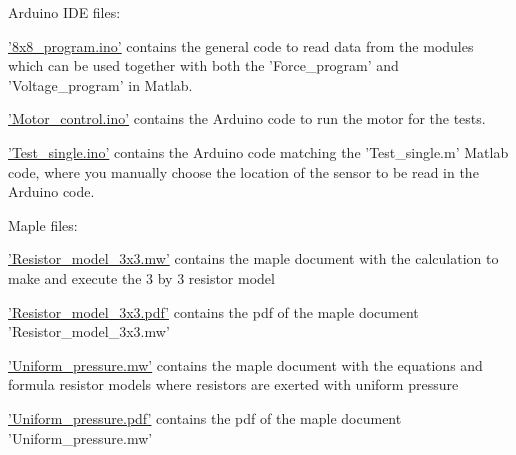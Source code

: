 Arduino IDE files:
    \begin{continuing}
        \item 
        \href{https://github.com/s214413/Force-Displacement-Visualization-through-3D-Printed-Sensor-Grid/blob/main/Arduino/8x8_program.ino}{'8x8\_program.ino'} contains the general code to read data from the modules which can be used together with both the 'Force\_program' and 'Voltage\_program' in Matlab.
        \item 
        \href{https://github.com/s214413/Force-Displacement-Visualization-through-3D-Printed-Sensor-Grid/blob/main/Arduino/Motor_control.ino}{'Motor\_control.ino'} contains the Arduino code to run the motor for the tests.
        \item 
        \href{https://github.com/s214413/Force-Displacement-Visualization-through-3D-Printed-Sensor-Grid/blob/main/Arduino/Test_single.ino}{'Test\_single.ino'} contains the Arduino code matching the 'Test\_single.m' Matlab code, where you manually choose the location of the sensor to be read in the Arduino code.
    \end{continuing}
    
Maple files:
    \begin{continuing}
        \item 
        \href{https://github.com/s214413/Force-Displacement-Visualization-through-3D-Printed-Sensor-Grid/blob/main/Maple/Resistor_model_3x3.mw}{'Resistor\_model\_3x3.mw'} contains the maple document with the calculation to make and execute the 3 by 3 resistor model
        \item 
        \href{https://github.com/s214413/Force-Displacement-Visualization-through-3D-Printed-Sensor-Grid/blob/main/Maple/Resistor_model_3x3.pdf}{'Resistor\_model\_3x3.pdf'} contains the pdf of the maple document 'Resistor\_model\_3x3.mw'
        \item 
        \href{https://github.com/s214413/Force-Displacement-Visualization-through-3D-Printed-Sensor-Grid/blob/main/Maple/Uniform_pressure.mw}{'Uniform\_pressure.mw'} contains the maple document with the equations and formula resistor models where resistors are exerted with uniform pressure
        \item 
        \href{https://github.com/s214413/Force-Displacement-Visualization-through-3D-Printed-Sensor-Grid/blob/main/Maple/Uniform_pressure.pdf}{'Uniform\_pressure.pdf'} contains the pdf of the maple document 'Uniform\_pressure.mw'
    \end{continuing}
